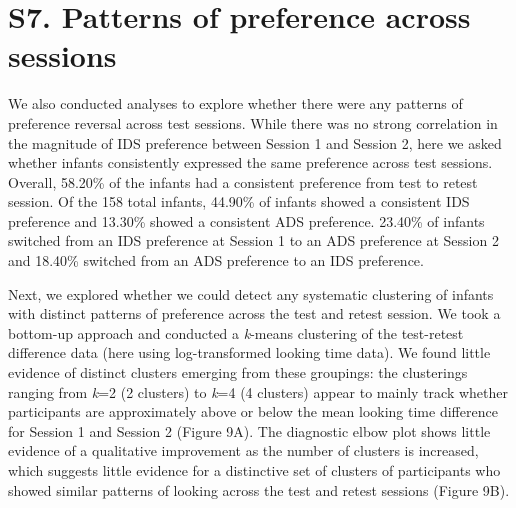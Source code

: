\documentclass[
  man, donotrepeattitle,floatsintext]{apa6}
\begin{document}
\newpage

\hypertarget{s7.-patterns-of-preference-across-sessions}{%
\section{S7. Patterns of preference across sessions}\label{s7.-patterns-of-preference-across-sessions}}

We also conducted analyses to explore whether there were any patterns of preference reversal across test sessions.
While there was no strong correlation in the magnitude of IDS preference between Session 1 and Session 2, here we asked whether infants consistently expressed the same preference across test sessions.
Overall, 58.20\% of the infants had a consistent preference from test to retest session.
Of the 158 total infants, 44.90\% of infants showed a consistent IDS preference and 13.30\% showed a consistent ADS preference.
23.40\% of infants switched from an IDS preference at Session 1 to an ADS preference at Session 2 and 18.40\% switched from an ADS preference to an IDS preference.

Next, we explored whether we could detect any systematic clustering of infants with distinct patterns of preference across the test and retest session.
We took a bottom-up approach and conducted a \emph{k}-means clustering of the test-retest difference data (here using log-transformed looking time data).
We found little evidence of distinct clusters emerging from these groupings: the clusterings ranging from \emph{k}=2 (2 clusters) to \emph{k}=4 (4 clusters) appear to mainly track whether participants are approximately above or below the mean looking time difference for Session 1 and Session 2 (Figure 9A).
The diagnostic elbow plot shows little evidence of a qualitative improvement as the number of clusters is increased, which suggests little evidence for a distinctive set of clusters of participants who showed similar patterns of looking across the test and retest sessions (Figure 9B).
\end{document}
